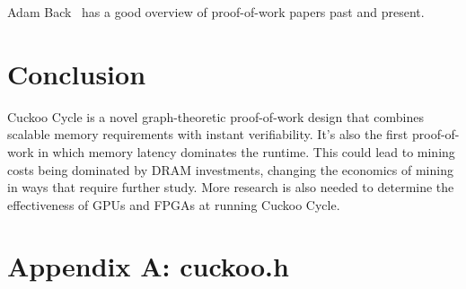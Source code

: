 \documentclass[11pt, oneside]{article}
\begin{document}
Adam Back~\cite{back2014} has a good overview of proof-of-work papers past
and present.

\section{Conclusion}
Cuckoo Cycle is a novel graph-theoretic proof-of-work design that combines scalable
memory requirements with instant verifiability. It's also the first proof-of-work in
which memory latency dominates the runtime.
This could lead to mining costs being dominated by DRAM investments,
changing the economics of mining in ways that require further study.
More research is also needed to determine the effectiveness of GPUs and FPGAs
at running Cuckoo Cycle.




\lstset{language=C,basicstyle=\footnotesize}
\section{Appendix A: cuckoo.h}


%

%
\end{document}
